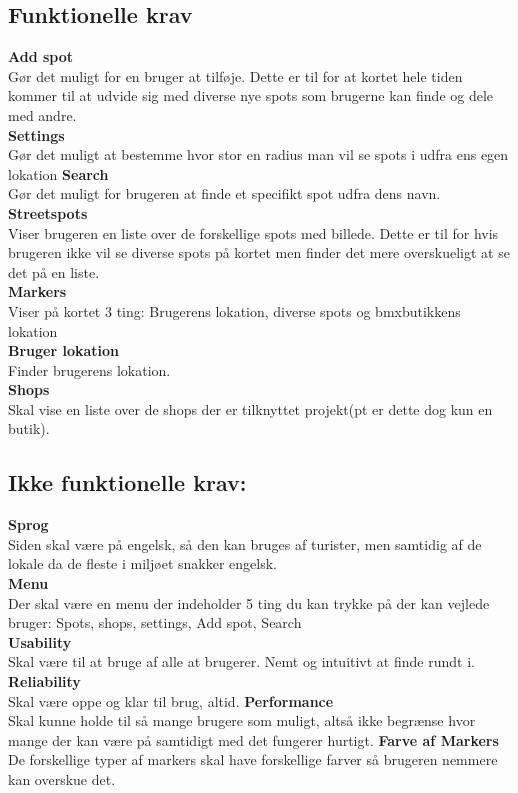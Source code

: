\documentclass[12pt]{article}
\begin{document}
\subsection*{Funktionelle krav}
\textbf{Add spot} \\ Gør det muligt for en bruger at tilføje. Dette er til for at kortet hele tiden kommer til at udvide sig med diverse nye spots som brugerne kan finde og dele med andre.\\
\textbf{Settings}\\ Gør det muligt at bestemme hvor stor en radius man vil se spots i udfra ens egen lokation
\textbf{Search}\\ Gør det muligt for brugeren at finde et specifikt spot udfra dens navn.
\textbf{Streetspots}\\ Viser brugeren en liste over de forskellige spots med billede. Dette er til for hvis brugeren ikke vil se diverse spots på kortet men finder det mere overskueligt at se det på en liste.\\
\textbf{Markers}\\ Viser på kortet 3 ting: Brugerens lokation, diverse spots og bmxbutikkens lokation\\
\textbf{Bruger lokation}\\ Finder brugerens lokation.\\
\textbf{Shops}\\ Skal vise en liste over de shops der er tilknyttet projekt(pt er dette dog kun en butik).
\subsection*{Ikke funktionelle krav:}
\textbf{Sprog}\\ Siden skal være på engelsk, så den kan bruges af turister, men samtidig af de lokale da de fleste i miljøet snakker engelsk.\\
\textbf{Menu}\\ Der skal være en menu der indeholder 5 ting du kan trykke på der kan vejlede bruger: Spots, shops, settings, Add spot, Search\\
\textbf{Usability}\\ Skal være til at bruge af alle at brugerer. Nemt og intuitivt at finde rundt i.
\textbf{Reliability}\\ Skal være oppe og klar til brug, altid.
\textbf{Performance}\\ Skal kunne holde til så mange brugere som muligt, altså ikke begrænse hvor mange der kan være på samtidigt med det fungerer hurtigt. 
\textbf{Farve af Markers}\\ De forskellige typer af markers skal have forskellige farver så brugeren nemmere kan overskue det.
\end{document}
